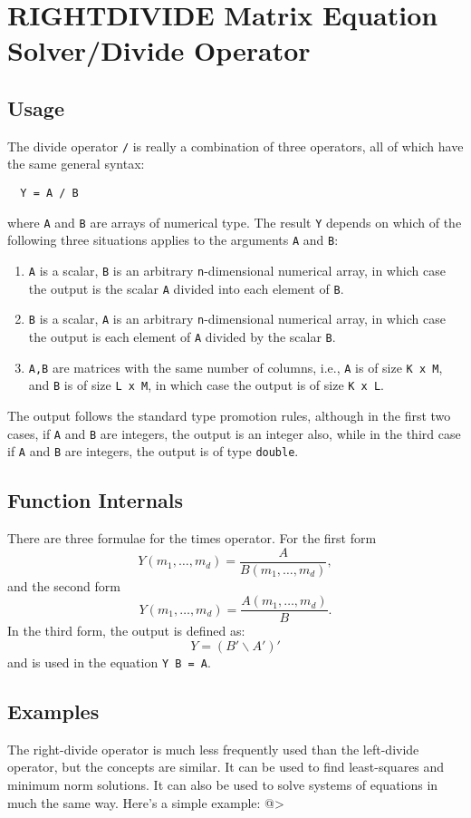 \section{RIGHTDIVIDE Matrix Equation Solver/Divide Operator}

\subsection{Usage}

The divide operator \verb|/| is really a combination of three
operators, all of which have the same general syntax:
\begin{verbatim}
  Y = A / B
\end{verbatim}
where \verb|A| and \verb|B| are arrays of numerical type.  The result \verb|Y| depends
on which of the following three situations applies to the arguments
\verb|A| and \verb|B|:
\begin{enumerate}
\item  \verb|A| is a scalar, \verb|B| is an arbitrary \verb|n|-dimensional numerical array, in which case the output is the scalar \verb|A| divided into each element of \verb|B|.

\item  \verb|B| is a scalar, \verb|A| is an arbitrary \verb|n|-dimensional numerical array, in which case the output is each element of \verb|A| divided by the scalar \verb|B|.

\item  \verb|A,B| are matrices with the same number of columns, i.e., \verb|A| is of size \verb|K x M|, and \verb|B| is of size \verb|L x M|, in which case the output is of size \verb|K x L|.

\end{enumerate}
The output follows the standard type promotion rules, although in the first two cases, if \verb|A| and \verb|B| are integers, the output is an integer also, while in the third case if \verb|A| and \verb|B| are integers, the output is of type \verb|double|.

\subsection{Function Internals}

There are three formulae for the times operator.  For the first form
\[
Y(m_1,\ldots,m_d) = \frac{A}{B(m_1,\ldots,m_d)},
\]
and the second form
\[
Y(m_1,\ldots,m_d) = \frac{A(m_1,\ldots,m_d)}{B}.
\]
In the third form, the output is defined as:
\[
  Y = (B' \backslash A')'
\]
and is used in the equation \verb|Y B = A|.
\subsection{Examples}

The right-divide operator is much less frequently used than the left-divide operator, but the concepts are similar.  It can be used to find least-squares and minimum norm solutions.  It can also be used to solve systems of equations in much the same way.  Here's a simple example:
@>
